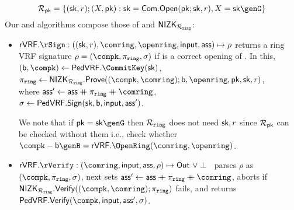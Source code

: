  $$\rel_{\pk} = \{(\sk,r);(X, \pk): \sk = \mathsf{Com}.\mathsf{Open}(\pk;\sk,r), X = \sk\genG\}$$
Our \Sign and \Verify algorithms compose those of \PedVRF and
 ${\mathsf{NIZK}}_{\mathcal{R}_{\mathtt{ring}}}$:
\def\tmpaux{\aux \doubleplus \piring \doubleplus \comring}
\def\tmpeprintaux{\eprint{\aux'}{\tmpaux}}
\def\tmpindent{\hspace*{5pt}}
\begin{itemize}
	\item $\rVRF.\rSign : ((\sk,r),\comring, \openring,\msg,\aux) \mapsto \rho$
	returns a ring VRF signature $\rho = (\compk,\piring,\sigma)$
	if \openring is a correct opening of \comring.  In this, 
	\tmpindent $(\openpk,\compk) \leftarrow \PedVRF.\CommitKey(\sk)$,  \\
	\tmpindent $\piring \leftarrow \NIZK_{\Rring}.\Prove((\compk,\comring); \openpk,\openring, \pk,\sk,r)$, \\
	where 
	\tmpindent $\aux' \leftarrow \tmpaux$,  \\
	\tmpindent $\sigma \leftarrow {\ensuremath{\mathsf{PedVRF}}}.{\mathsf{Sign}}(\mathsf{sk},\mathsf{b},\mathsf{input}, \mathsf{ass}')$.
	
	
	We note that if $ \pk = \sk\genG $ then $ \mathcal{R}_{\mathtt{ring}} $ does not need $ \mathsf{sk},r $ since $ \mathcal{R}_{\mathsf{pk}} $ can be checked without them i.e., check whether $ \compk - \openpk \genB = \rVRF.\OpenRing(\comring,\openring) $.
	\item $\rVRF.\rVerify : (\comring,\msg,\aux,\rho) \mapsto \Out \,\, \lor \perp$ \,
	parses $\rho$ as $(\compk,\piring,\sigma)$, next sets $\aux' \leftarrow \tmpaux$,
	aborts if $\NIZK_{\Rring}.\Verify((\compk,\comring); \piring)$ fails,
	and returns $\PedVRF.\Verify(\compk,\msg, \aux', \sigma)$.
\end{itemize}





